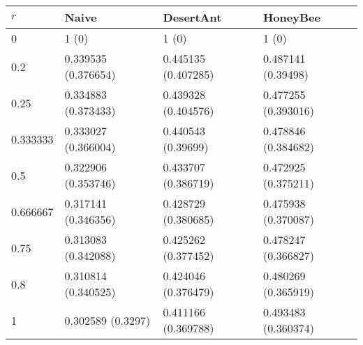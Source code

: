 \begin{tabular} {|l|l|l|l|}
\hline
$r$ & Naive & DesertAnt & HoneyBee \\
\hline
0 & 1 (0)  & 1 (0)  & 1 (0)  \\
0.2 & 0.339535 (0.376654)  & 0.445135 (0.407285)  & 0.487141 (0.39498)  \\
0.25 & 0.334883 (0.373433)  & 0.439328 (0.404576)  & 0.477255 (0.393016)  \\
0.333333 & 0.333027 (0.366004)  & 0.440543 (0.39699)  & 0.478846 (0.384682)  \\
0.5 & 0.322906 (0.353746)  & 0.433707 (0.386719)  & 0.472925 (0.375211)  \\
0.666667 & 0.317141 (0.346356)  & 0.428729 (0.380685)  & 0.475938 (0.370087)  \\
0.75 & 0.313083 (0.342088)  & 0.425262 (0.377452)  & 0.478247 (0.366827)  \\
0.8 & 0.310814 (0.340525)  & 0.424046 (0.376479)  & 0.480269 (0.365919)  \\
1 & 0.302589 (0.3297)  & 0.411166 (0.369788)  & 0.493483 (0.360374)  \\
\hline
\end{tabular}
